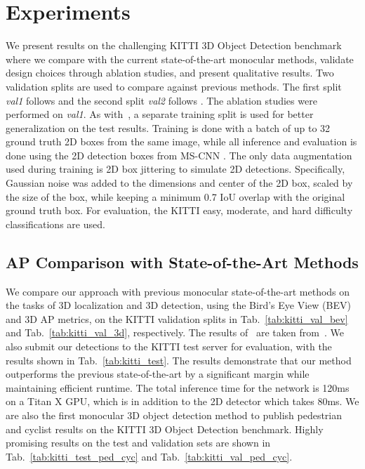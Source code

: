 \documentclass[10pt,twocolumn,letterpaper]{article}
\begin{document}
	\section{Experiments}\label{sec:experiments}
	We present results on the challenging KITTI 3D Object Detection benchmark where we compare with the current state-of-the-art monocular methods, validate design choices through ablation studies, and present qualitative results. Two validation splits are used to compare against previous methods. The first split \textit{val1} follows \cite{chen_mv3d} and the second split \textit{val2} follows \cite{xiang_3dvp}. The ablation studies were performed on \textit{val1}. As with~\cite{lindernoren, qi_fpointnet}, a separate training split is used for better generalization on the test results. Training is done with a batch of up to 32 ground truth 2D boxes from the same image, while all inference and evaluation is done using the 2D detection boxes from MS-CNN \cite{cai}. The only data augmentation used during training is 2D box jittering to simulate 2D detections. Specifically, Gaussian noise was added to the dimensions and center of the 2D box, scaled by the size of the box, while keeping a minimum 0.7 IoU overlap with the original ground truth box. For evaluation, the KITTI easy, moderate, and hard difficulty classifications are used.
	
	\subsection{AP Comparison with State-of-the-Art Methods}
	We compare our approach with previous monocular state-of-the-art methods on the tasks of 3D localization and 3D detection, using the Bird's Eye View (BEV) and 3D AP metrics, on the KITTI validation splits in Tab.~\ref{tab:kitti_val_bev} and Tab.~\ref{tab:kitti_val_3d}, respectively. The results of~\cite{chen_mono3d, mousavian_deep3dbox} are taken from~\cite{xu_multifusion}. We also submit our detections to the KITTI test server for evaluation, with the results shown in Tab.~\ref{tab:kitti_test}. The results demonstrate that our method outperforms the previous state-of-the-art by a significant margin while maintaining efficient runtime. The total inference time for the network is 120ms on a Titan X GPU, which is in addition to the 2D detector which takes 80ms. We are also the first monocular 3D object detection method to publish pedestrian and cyclist results on the KITTI 3D Object Detection benchmark. Highly promising results on the test and validation sets are shown in Tab.~\ref{tab:kitti_test_ped_cyc} and Tab.~\ref{tab:kitti_val_ped_cyc}.
	
\end{document}
